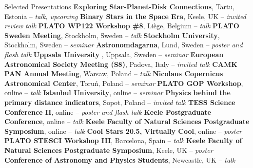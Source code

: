 \begin{rubric}{Selected Presentations}
\entry*[2025]%
        \textbf{Exploring Star-Planet-Disk Connections}, Tartu, Estonia -- \textit{talk, upcoming} 
\entry*[2025]%
        \textbf{Binary Stars in the Space Era}, Keele, UK -- \textit{invited review talk} 
\entry*[2025]%
        \textbf{PLATO WP122 Workshop \#8}, Li\`{e}ge, Belgium -- \textit{talk}
\entry*[2025]%
        \textbf{PLATO Sweden Meeting}, Stockholm, Sweden -- \textit{talk}
\entry*[2025]%
        \textbf{Stockholm University}, Stockholm, Sweden -- \textit{seminar}
\entry*[2024]%
        \textbf{Astronomdagarna}, Lund, Sweden -- \textit{poster and flash talk} 
\entry*[2024]%
        \textbf{Uppsala University }, Uppsala, Sweden -- \textit{seminar}
\entry*[2024]%
        \textbf{European Astronomical Society Meeting (S8)}, Padova, Italy -- \textit{invited talk}
\entry*[2024]%
        \textbf{CAMK PAN Annual Meeting}, Warsaw, Poland -- \textit{talk} 
\entry*[2023]%
        \textbf{Nicolaus Copernicus Astronomical Center}, Toru\'{n}, Poland -- \textit{seminar}
\entry*[2022]%
        \textbf{PLATO GOP Workshop}, online -- \textit{talk}
\entry*[2022]%
        \textbf{Istanbul University}, online -- \textit{seminar}
\entry*[2021]%
	\textbf{Physics behind the primary distance indicators}, Sopot, Poland -- \textit{invited talk}
\entry*[2021]%
	\textbf{TESS Science Conference II}, online -- \textit{poster and flash talk} 
\entry*[2021]%
	\textbf{Keele Postgraduate Conference}, online -- \textit{talk}
\entry*[2021]%
	\textbf{Keele Faculty of Natural Sciences Postgraduate Symposium}, online -- \textit{talk}
\entry*[2021]%
	\textbf{Cool Stars 20.5, Virtually Cool}, online -- \textit{poster} 
\entry*[2019]%
	\textbf{PLATO STESCI Workshop III}, Barcelona, Spain -- \textit{talk} 
\entry*[2019]%
    \textbf{Keele Faculty of Natural Sciences Postgraduate Symposium}, Keele, UK -- \textit{poster}
\entry*[2018]%
	\textbf{Conference of Astronomy and Physics Students}, Newcastle, UK -- \textit{talk} 
%
\end{rubric}